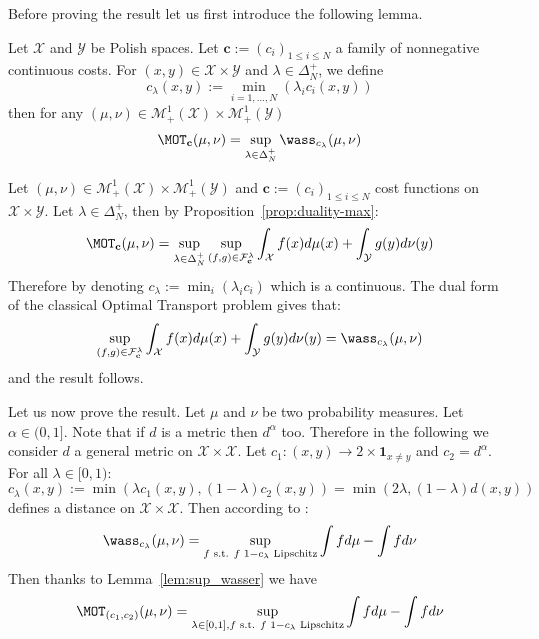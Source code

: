 \begin{prv*} 
Before proving the result let us first introduce the following lemma.

\begin{lemma}
\label{lem:sup_wasser}
Let $\mathcal{X}$ and $\mathcal{Y}$ be Polish spaces. Let $\mathbf{c}:=(c_i)_{1\leq i\leq N}$ a family of nonnegative continuous costs. For $(x,y)\in \mathcal{X}\times \mathcal{Y}$ and $\lambda\in\Delta_N^{+}$, we define 
$$c_\lambda(x,y):=\min_{i=1,...,N}(\lambda_i c_i(x,y))$$
then for any $(\mu,\nu)\in\mathcal{M}_+^{1}(\mathcal{X})\times\mathcal{M}_+^{1}(\mathcal{Y})$  
\begin{align}
    \MOT_{\mathbf{c}}(\mu,\nu)=\sup_{\lambda\in\Delta_N^{+}} \wass_{c_\lambda}(\mu,\nu)
\end{align}
\end{lemma}

\begin{prv*}
Let $(\mu,\nu)\in\mathcal{M}_+^{1}(\mathcal{X})\times\mathcal{M}_+^{1}(\mathcal{Y})$ and $\mathbf{c}:=(c_i)_{1\leq i\leq N}$ cost functions on $\mathcal{X}\times \mathcal{Y}$. Let $\lambda\in\Delta_N^{+}$, then by Proposition~\ref{prop:duality-max}:
\begin{align*}
    \MOT_{\mathbf{c}}(\mu,\nu)= \sup_{\lambda\in\Delta_N^{+}} \sup_{(f,g)\in \mathcal{F}_{\mathbf{c}}^{\lambda}} \int_{\mathcal{X}} f(x)d\mu(x)+ \int_{\mathcal{Y}} g(y)d\nu(y)
\end{align*}
Therefore by denoting $c_\lambda:=\min_i(\lambda_ic_i)$ which is a continuous. The dual form of the classical Optimal Transport problem gives that:
\begin{align*}
\sup_{(f,g)\in \mathcal{F}_{\mathbf{c}}^{\lambda}} \int_{\mathcal{X}} f(x)d\mu(x)+ \int_{\mathcal{Y}} g(y)d\nu(y) =  \wass_{c_\lambda}(\mu,\nu)
\end{align*}
and the result follows.
\end{prv*}
Let us now prove the result. Let $\mu$ and $\nu$ be two probability measures. Let $\alpha\in (0,1]$. Note that if $d$ is a metric then $d^\alpha$ too. Therefore in the following we consider $d$ a general metric on $\mathcal{X}\times\mathcal{X}$. Let $c_1:(x,y)\rightarrow2\times \mathbf{1}_{x\neq y}$ and $c_2=d^{\alpha}$. For all $\lambda\in[0,1)$:
$$c_\lambda(x,y) := \min(\lambda c_1(x,y),(1-\lambda)c_2(x,y))=\min(2\lambda,(1-\lambda)d(x,y))$$
defines a distance on  $\mathcal{X}\times\mathcal{X}$. Then according to \cite[Theorem 1.14]{villani2003topics}: 
$$\wass_{c_\lambda}(\mu,\nu)=\sup_{f\text{ s.t. } f\text{ }1-c_\lambda\text{ Lipschitz}}\int fd\mu-\int fd\nu$$
Then thanks to Lemma~\ref{lem:sup_wasser} we have
$$\MOT_{(c_1,c_2)}(\mu,\nu) = \sup_{\lambda\in[0,1],f\text{ s.t. } f\text{ }1-c_\lambda\text{ Lipschitz}}\int fd\mu-\int fd\nu$$


\end{prv*}
